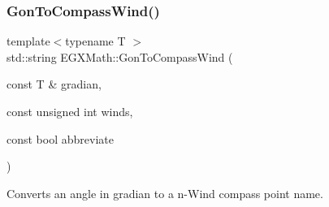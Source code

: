 \subsubsection{\texorpdfstring{Gon\+To\+Compass\+Wind()}{GonToCompassWind()}}
{\footnotesize\ttfamily template$<$typename T $>$ \\
std\+::string E\+G\+X\+Math\+::\+Gon\+To\+Compass\+Wind (\begin{DoxyParamCaption}\item[{const T \&}]{gradian,  }\item[{const unsigned int}]{winds,  }\item[{const bool}]{abbreviate }\end{DoxyParamCaption})}



Converts an angle in gradian to a n-\/\+Wind compass point name. 

